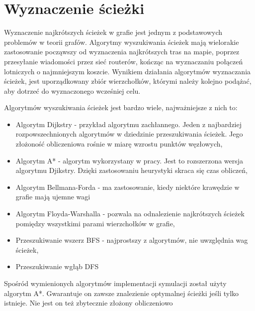 \chapter{Wyznaczenie ścieżki}
\label{wyznaczenieSciezki}

Wyznaczenie najkrótszych ścieżek w grafie jest jednym z podstawowych problemów w teorii grafów. Algorytmy wyszukiwania ścieżek mają wielorakie zastosowanie począwszy od wyznaczenia najkrótszych tras na mapie, poprzez przesyłanie wiadomości przez sieć routerów, kończąc na wyznaczaniu połączeń lotniczych o najmniejszym koszcie. Wynikiem działania algorytmów wyznaczania ścieżek, jest uporządkowany zbiór wierzchołków, którymi należy kolejno podążać, aby dotrzeć do wyznaczonego wcześniej celu.

Algorytmów wyszukiwania ścieżek jest bardzo wiele, najważniejsze z nich to:

\begin{itemize}
\item Algorytm Dijkstry - przykład algorytmu zachłannego. Jeden z najbardziej rozpowszechnionych algorytmów w dziedzinie przeszukiwania ścieżek. Jego złożoność obliczeniowa rośnie w miarę wzrostu punktów węzłowych,
\item Algorytm A* - algorytm wykorzystany w pracy. Jest to rozszerzona wersja algorytmu Djikstry. Dzięki zastosowaniu heurystyki skraca się czas obliczeń,
\item Algorytm Bellmana-Forda - ma zastosowanie, kiedy niektóre krawędzie w grafie mają ujemne wagi
\item Algorytm Floyda-Warshalla - pozwala na odnalezienie najkrótszych ścieżek pomiędzy wszystkimi parami wierzchołków w grafie,
\item Przeszukiwanie wszerz BFS - najprostszy z algorytmów, nie uwzględnia wag ścieżek,
\item Przeszukiwanie wgłąb DFS
\end{itemize}

Spośród wymienionych algorytmów implementacji symulacji został użyty algorytm A*. Gwarantuje on zawsze znalezienie optymalnej ścieżki jeśli tylko istnieje. Nie jest on też zbytecznie złożony obliczeniowo